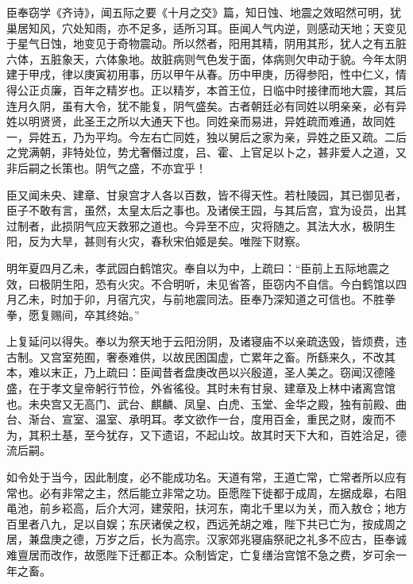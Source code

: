 \documentclass[12pt,UTF8]{ctexbook}
\begin{document}
臣奉窃学《齐诗》，闻五际之要《十月之交》篇，知日蚀、地震之效昭然可明，犹巢居知风，穴处知雨，亦不足多，适所习耳。臣闻人气内逆，则感动天地；天变见于星气日蚀，地变见于奇物震动。所以然者，阳用其精，阴用其形，犹人之有五脏六体，五脏象天，六体象地。故脏病则气色发于面，体病则欠申动于貌。今年太阴建于甲戌，律以庚寅初用事，历以甲午从春。历中甲庚，历得参阳，性中仁义，情得公正贞廉，百年之精岁也。正以精岁，本首王位，日临中时接律而地大震，其后连月久阴，虽有大令，犹不能复，阴气盛矣。古者朝廷必有同姓以明亲亲，必有异姓以明贤贤，此圣王之所以大通天下也。同姓亲而易进，异姓疏而难通，故同姓一，异姓五，乃为平均。今左右亡同姓，独以舅后之家为亲，异姓之臣又疏。二后之党满朝，非特处位，势尤奢僭过度，吕、霍、上官足以卜之，甚非爱人之道，又非后嗣之长策也。阴气之盛，不亦宜乎！



臣又闻未央、建章、甘泉宫才人各以百数，皆不得天性。若杜陵园，其已御见者，臣子不敢有言，虽然，太皇太后之事也。及诸侯王园，与其后宫，宜为设员，出其过制者，此损阴气应天救邪之道也。今异至不应，灾将随之。其法大水，极阴生阳，反为大旱，甚则有火灾，春秋宋伯姬是矣。唯陛下财察。



明年夏四月乙未，孝武园白鹤馆灾。奉自以为中，上疏曰：“臣前上五际地震之效，曰极阴生阳，恐有火灾。不合明听，未见省答，臣窃内不自信。今白鹤馆以四月乙未，时加于卯，月宿亢灾，与前地震同法。臣奉乃深知道之可信也。不胜拳拳，愿复赐间，卒其终始。”



上复延问以得失。奉以为祭天地于云阳汾阴，及诸寝庙不以亲疏迭毁，皆烦费，违古制。又宫室苑囿，奢泰难供，以故民困国虚，亡累年之畜。所繇来久，不改其本，难以末正，乃上疏曰：臣闻昔者盘庚改邑以兴殷道，圣人美之。窃闻汉德隆盛，在于孝文皇帝躬行节俭，外省徭役。其时未有甘泉、建章及上林中诸离宫馆也。未央宫又无高门、武台、麒麟、凤皇、白虎、玉堂、金华之殿，独有前殿、曲台、渐台、宣室、温室、承明耳。孝文欲作一台，度用百金，重民之财，废而不为，其积土基，至今犹存，又下遗诏，不起山坟。故其时天下大和，百姓洽足，德流后嗣。



如令处于当今，因此制度，必不能成功名。天道有常，王道亡常，亡常者所以应有常也。必有非常之主，然后能立非常之功。臣愿陛下徙都于成周，左据成皋，右阻黾池，前乡崧高，后介大河，建荥阳，扶河东，南北千里以为关，而入敖仓；地方百里者八九，足以自娱；东厌诸侯之权，西远羌胡之难，陛下共已亡为，按成周之居，兼盘庚之德，万岁之后，长为高宗。汉家郊兆寝庙祭祀之礼多不应古，臣奉诚难亶居而改作，故愿陛下迁都正本。众制皆定，亡复缮治宫馆不急之费，岁可余一年之畜。
\end{document}

